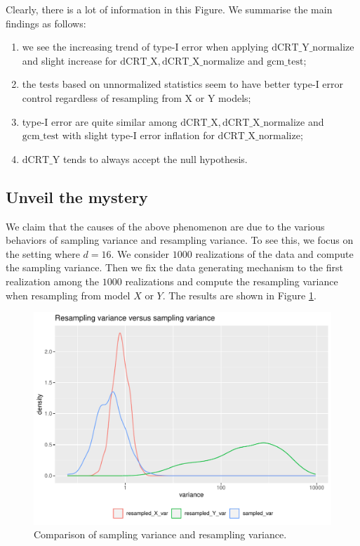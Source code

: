 \documentclass{article}
\begin{document}
Clearly, there is a lot of information in this Figure. We summarise the main findings as follows:
\begin{enumerate}
    \item we see the increasing trend of type-I error when applying 
    $\mathrm{dCRT}\_\text{Y}\_\text{normalize}$ and slight increase for $\mathrm{dCRT}\_\text{X},\mathrm{dCRT}\_\text{X}\_\text{normalize}$
    and $\mathrm{gcm}\_\text{test}$;
    \item the tests based on unnormalized statistics seem to have better type-I error control regardless 
    of resampling from X or Y models;
    \item type-I error are quite similar among $\mathrm{dCRT}\_\text{X},\mathrm{dCRT}\_\text{X}\_\text{normalize}$ 
    and $\mathrm{gcm}\_\text{test}$ with slight type-I error inflation for $\mathrm{dCRT}\_\text{X}\_\text{normalize}$;
    \item $\mathrm{dCRT}\_\text{Y}$
    tends to always accept the null hypothesis.
\end{enumerate}


\subsection{Unveil the mystery}

We claim that the causes of the above phenomenon are due to the various behaviors of sampling variance and resampling variance. 
To see this, we focus on the setting where $d=16$. We consider $1000$ realizations of the data and compute the sampling variance.
Then we fix the data generating mechanism to the first realization among the $1000$ realizations and compute the resampling variance
when resampling from model $X$ or $Y$. The results are shown in Figure \ref{fig:variance_comparison}.

\begin{figure}[!h]
    \centering
        \includegraphics[scale = 0.7]{Figures/Q2/var_comparison.pdf}
    \caption{Comparison of sampling variance and resampling variance.}
    \label{fig:variance_comparison}
\end{figure}
\end{document}
